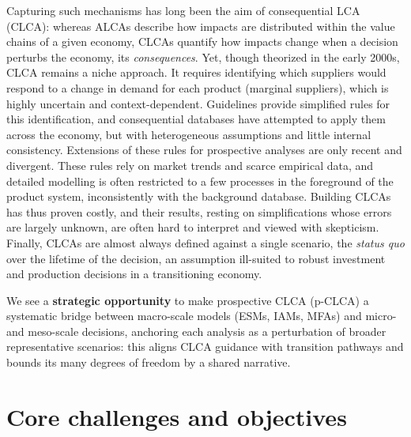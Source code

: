\documentclass[compact]{nserc} %
\begin{document}
Capturing such mechanisms has long been the aim of consequential LCA (CLCA): whereas ALCAs describe how impacts are distributed within the value chains of a given economy, CLCAs quantify how impacts change when a decision perturbs the economy, its \emph{consequences}. Yet, though theorized in the early 2000s, CLCA remains a niche approach. It requires identifying which suppliers would respond to a change in demand for each product (marginal suppliers), which is highly uncertain and context-dependent. Guidelines provide simplified rules for this identification, and consequential databases have attempted to apply them across the economy, but with heterogeneous assumptions and little internal consistency. Extensions of these rules for prospective analyses are only recent and divergent. These rules rely on market trends and scarce empirical data, and detailed modelling is often restricted to a few processes in the foreground of the product system, inconsistently with the background database. Building CLCAs has thus proven costly, and their results, resting on simplifications whose errors are largely unknown, are often hard to interpret and viewed with skepticism. Finally, CLCAs are almost always defined against a single scenario, the \emph{status quo} over the lifetime of the decision, an assumption ill-suited to robust investment and production decisions in a transitioning economy.

We see a \textbf{strategic opportunity} to make prospective CLCA (p-CLCA) a systematic bridge between macro-scale models (ESMs, IAMs, MFAs) and micro- and meso-scale decisions, anchoring each analysis as a  perturbation of broader representative scenarios: this aligns CLCA guidance with transition pathways and bounds its many degrees of freedom by a shared narrative.

\section{Core challenges and objectives}
\end{document}
